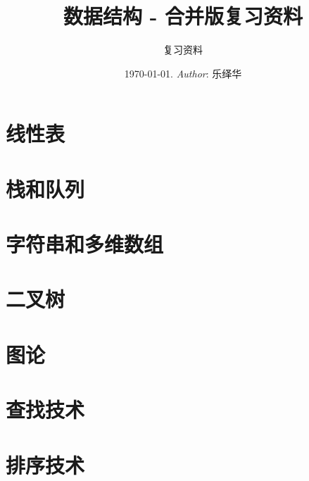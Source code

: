 \documentclass[12pt,a4paper]{amsart}
\title{\textbf{数据结构 - 合并版复习资料}}
\author{复习资料}
\date{\today. \textit{Author}: 乐绎华}
\begin{document}
\maketitle
\tableofcontents
\newpage

\part{线性表}

\part{栈和队列}

\part{字符串和多维数组}

\part{二叉树}

\part{图论}

\part{查找技术}

\part{排序技术}









% 
% 
% 
\end{document}
